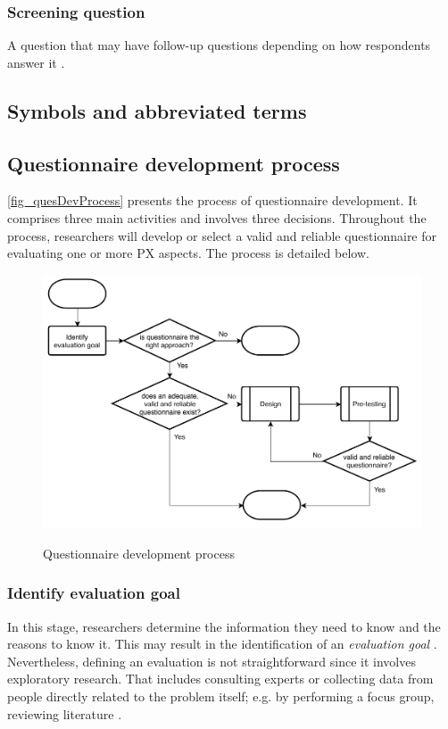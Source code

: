 \subsubsection{Screening question}
A question that may have follow-up questions depending on how respondents answer it \autocite{Krosnick2009}.

\subsection{Symbols and abbreviated terms}
\begin{acronym}[UML]
\end{acronym}

\subsection{Questionnaire development process}

\autoref{fig_quesDevProcess} presents the process of questionnaire development. It comprises three main activities and involves three decisions. Throughout the process, researchers will develop or select a valid and reliable questionnaire for evaluating one or more \ac{PX} aspects. The process is detailed below.

\begin{figure}[htb]
\myfloatalign
{\includegraphics[width=0.9\linewidth]{gfx/standard/quesDevProcess}} \quad
\caption{Questionnaire development process}\label{fig_quesDevProcess}
\end{figure}

\subsubsection{Identify evaluation goal}
In this stage, researchers determine the information they need to know and the reasons to know it. This may result in the identification of an \emph{evaluation goal} \autocite{Diem,Radhakrishna2007,Crawford1997}. Nevertheless, defining an evaluation is not straightforward since it involves exploratory research. That includes consulting experts or collecting data from people directly related to the problem itself; e.g. by performing a focus group, reviewing literature \autocite{Crawford1997}.

